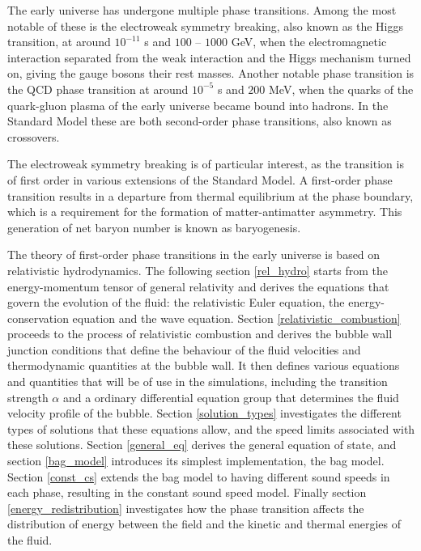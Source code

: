 The early universe has undergone multiple phase transitions.
Among the most notable of these is the electroweak symmetry breaking, also known as the Higgs transition, at around $10^{-11}$ s and $100$ -- $1000$ GeV,
when the electromagnetic interaction separated from the weak interaction and the Higgs mechanism turned on,
giving the gauge bosons their rest masses.
Another notable phase transition is the QCD phase transition at around $10^{-5}$ s and $200$ MeV,
when the quarks of the quark-gluon plasma of the early universe became bound into hadrons.
In the Standard Model these are both second-order phase transitions, also known as crossovers.
\cites{lecture_notes}{aoki_order_2006}

The electroweak symmetry breaking is of particular interest,
as the transition is of first order in various extensions of the Standard Model.
A first-order phase transition results in a departure from thermal equilibrium at the phase boundary,
which is a requirement for the formation of matter-antimatter asymmetry.
This generation of net baryon number is known as baryogenesis.
\cite{lecture_notes}

The theory of first-order phase transitions in the early universe is based on relativistic hydrodynamics.
The following section \ref{rel_hydro} starts from the energy-momentum tensor of general relativity and derives the equations that
govern the evolution of the fluid: the relativistic Euler equation, the energy-conservation equation and the wave equation.
Section \ref{relativistic_combustion} proceeds to the process of relativistic combustion and derives the bubble wall junction conditions
that define the behaviour of the fluid velocities and thermodynamic quantities at the bubble wall.
It then defines various equations and quantities that will be of use in the simulations,
including the transition strength $\alpha$ and a ordinary differential equation group that determines the fluid velocity profile of the bubble.
Section \ref{solution_types} investigates the different types of solutions that these equations allow,
and the speed limits associated with these solutions.
Section \ref{general_eq} derives the general equation of state,
and section \ref{bag_model} introduces its simplest implementation, the bag model.
Section \ref{const_cs} extends the bag model to having different sound speeds in each phase,
resulting in the constant sound speed model.
Finally section \ref{energy_redistribution} investigates how the phase transition affects the distribution of energy between the field and the kinetic and thermal energies of the fluid.


